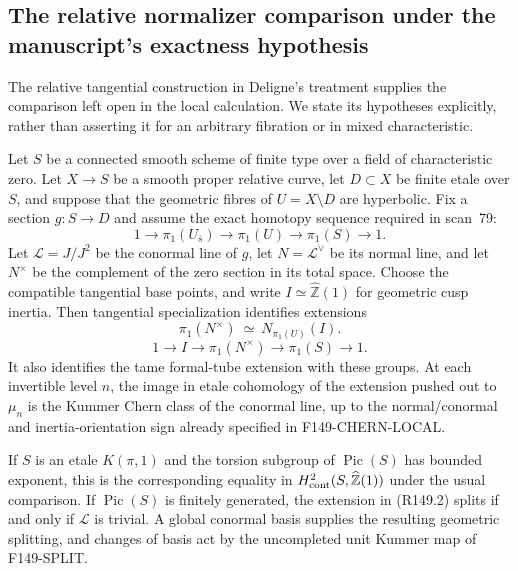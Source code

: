 \subsection{The relative normalizer comparison under the manuscript's exactness hypothesis}

The relative tangential construction in Deligne's treatment supplies
the comparison left open in the local calculation. We state its
hypotheses explicitly, rather than asserting it for an arbitrary
fibration or in mixed characteristic.

\begin{theorem}[F149-RELATIVE]\label{thm:archive-relative}
Let $S$ be a connected smooth scheme of finite type over a field of
characteristic zero. Let $X\to S$ be a smooth proper relative curve,
let $D\subset X$ be finite etale over $S$, and suppose that the
geometric fibres of $U=X\setminus D$ are hyperbolic. Fix a section
$g:S\to D$ and assume the exact homotopy sequence required in scan~79:
\[
 1\longrightarrow\pi_1(U_{\bar s})
 \longrightarrow\pi_1(U)\longrightarrow\pi_1(S)\longrightarrow1.
                                                               \tag{R149.1}
\]
Let $\mathcal L=J/J^2$ be the conormal line of $g$, let
$N=\mathcal L^\vee$ be its normal line, and let $N^\times$
be the complement of the zero section in its total space.
Choose the compatible tangential base points, and write
$I\simeq\widehat{\mathbb Z}(1)$ for geometric cusp inertia.
Then tangential specialization identifies extensions
\[
 \pi_1(N^\times)\ \simeq\ N_{\pi_1(U)}(I).
\]
\[
 1\longrightarrow I\longrightarrow\pi_1(N^\times)
 \longrightarrow\pi_1(S)\longrightarrow1.                       \tag{R149.2}
\]
It also identifies the tame formal-tube extension with these groups.
At each invertible level $n$, the image in etale cohomology of the
extension pushed out to $\mu_n$ is the Kummer Chern class of the
conormal line, up to the normal/conormal and inertia-orientation sign
already specified in F149-CHERN-LOCAL.

If $S$ is an etale $K(\pi,1)$ and the torsion subgroup of
$\operatorname{Pic}(S)$ has bounded exponent, this is the corresponding equality in
$H^2_{\rm cont}(S,\widehat{\mathbb Z}(1))$ under the usual comparison.
If $\operatorname{Pic}(S)$ is finitely generated, the extension in
(R149.2) splits if and only if $\mathcal L$ is trivial. A global
conormal basis supplies the resulting geometric splitting, and changes
of basis act by the uncompleted unit Kummer map of F149-SPLIT.
\end{theorem}

